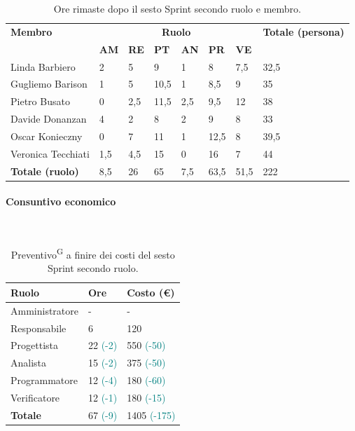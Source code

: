 \documentclass[8pt]{article}
\newcommand{\glossterm}[1]{#1\textsuperscript{G}} %
\newcommand{\subsubsubsection}[1]{\paragraph{#1}\mbox{}\\}
\begin{document}
\begin{table}[ht!]
	\centering
	\begin{tabular}{p{4cm} p{1cm} p{1cm} p{1cm} p{1cm} p{1cm} p{1cm} p{3cm}}
		\toprule
        \textbf{Membro} & \multicolumn{6}{c}{\textbf{Ruolo}} & \textbf{Totale (persona)}\\
		& \textbf{AM} & \textbf{RE} & \textbf{PT} & \textbf{AN} & \textbf{PR} & \textbf{VE}\\
		\midrule
        Linda Barbiero & 2 & 5 & 9 & 1 & 8 & 7,5 & 32,5 \\ 
        Gugliemo Barison & 1 & 5 & 10,5 & 1 & 8,5 & 9 & 35 \\ 
        Pietro Busato & 0 & 2,5 & 11,5 & 2,5 & 9,5 & 12 & 38 \\ 
        Davide Donanzan & 4 & 2 & 8 & 2 & 9 & 8 & 33 \\ 
        Oscar Konieczny & 0 & 7 & 11 & 1 & 12,5 & 8 & 39,5 \\ 
        Veronica Tecchiati & 1,5 & 4,5 & 15 & 0 & 16 & 7 & 44 \\ 
        \midrule
        \textbf{Totale (ruolo)} & 8,5 & 26 & 65 & 7,5 & 63,5 & 51,5 & 222 \\
        \bottomrule
	\end{tabular}
	\caption{Ore rimaste dopo il sesto Sprint secondo ruolo e membro.}
	\label{table:Ore rimaste dopo il sesto Sprint secondo ruolo e membro.}
\end{table}
\subsubsubsection{Consuntivo economico}
\begin{table}[ht!]
    \centering
    \begin{tabular}{p{4cm} p{1.8cm} p{2.2cm}}
        \toprule
        \textbf{Ruolo} & \textbf{Ore} & \textbf{Costo (€)} \\
        \midrule
        Amministratore & -                         & -   \\
        Responsabile   & 6                         & 120 \\
        Progettista    & 22 \textcolor{teal}{(-2)} & 550 \textcolor{teal}{(-50)} \\
        Analista       & 15 \textcolor{teal}{(-2)} & 375 \textcolor{teal}{(-50)} \\
        Programmatore  & 12 \textcolor{teal}{(-4)} & 180 \textcolor{teal}{(-60)} \\
        Verificatore   & 12 \textcolor{teal}{(-1)} & 180 \textcolor{teal}{(-15)} \\
        \midrule
        \textbf{Totale} & 67 \textcolor{teal}{(-9)} & 1405 \textcolor{teal}{(-175)} \\
        \bottomrule
    \end{tabular}
    \caption{\glossterm{Preventivo} a finire dei costi del sesto Sprint secondo ruolo.}
    \label{table:Preventivo a finire dei costi del sesto Sprint secondo ruolo}
\end{table}
\end{document}
